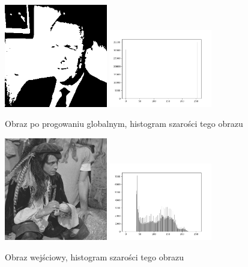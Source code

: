 \documentclass[final,a4paper,openany,12pt]{mwbk}
\begin{document}
\begin{figure}[H]
	\begin{center}
		\includegraphics[width=0.4\textwidth]{gentelman_gray_globThreshold_result}
		\includegraphics[width=0.4\textwidth]{gentelman_gray_globThreshold_histogram}
	\end{center}
	\caption{Obraz po progowaniu globalnym, histogram szarości tego obrazu}
\end{figure}

\begin{figure}[H]
	\begin{center}
		\includegraphics[width=0.4\textwidth]{pirate_gray}
		\includegraphics[width=0.4\textwidth]{pirate_gray_histogram}
	\end{center}
	\caption{Obraz wejściowy, histogram szarości tego obrazu}
\end{figure}
\end{document}
